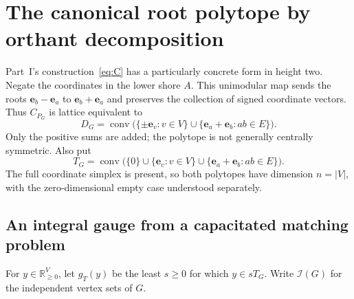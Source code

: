 \documentclass[11pt]{article}
\numberwithin{equation}{section}
\theoremstyle{definition}
\newcommand{\R}{\mathbb R}
\newcommand{\conv}{\operatorname{conv}}
\newcommand{\ee}{\mathbf e}
\begin{document}
\section{The canonical root polytope by orthant decomposition}\label{htwo:sec:root}

Part~I's construction~\eqref{eq:C} has a particularly concrete form in height
two. Negate the coordinates in the lower shore $A$. This unimodular map
sends the roots $\ee_b-\ee_a$ to $\ee_b+\ee_a$ and preserves the collection
of signed coordinate vectors. Thus $C_{P_G}$ is lattice equivalent to
\begin{equation}
 D_G=\conv\bigl(\{\pm\ee_v:v\in V\}\cup
                     \{\ee_a+\ee_b:ab\in E\}\bigr).
 \label{htwo:eq:DG}
\end{equation}
Only the positive sums are added; the polytope is not generally centrally
symmetric. Also put
\begin{equation}
 T_G=\conv\bigl(\{0\}\cup\{\ee_v:v\in V\}\cup
                     \{\ee_a+\ee_b:ab\in E\}\bigr).
 \label{htwo:eq:TG}
\end{equation}
The full coordinate simplex is present, so both polytopes have dimension
$n=|V|$, with the zero-dimensional empty case understood separately.

\subsection{An integral gauge from a capacitated matching problem}

For $y\in\R_{\ge0}^V$, let $g_T(y)$ be the least $s\ge0$ for which
$y\in sT_G$. Write $\mathcal I(G)$ for the independent vertex sets of $G$.
\end{document}
